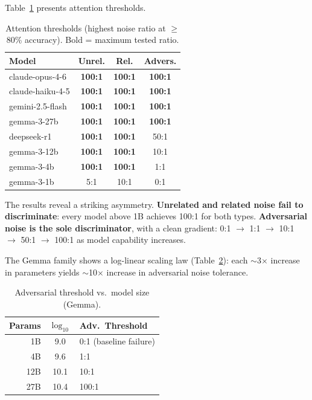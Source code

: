 \documentclass[11pt,twocolumn]{article}
\begin{document}
Table~\ref{tab:thresholds} presents attention thresholds.

\begin{table}[t]
\centering
\caption{Attention thresholds (highest noise ratio at $\geq$80\% accuracy). Bold = maximum tested ratio.}
\label{tab:thresholds}
\small
\begin{tabular}{@{}lccc@{}}
\toprule
\textbf{Model} & \textbf{Unrel.} & \textbf{Rel.} & \textbf{Advers.} \\
\midrule
claude-opus-4-6   & \textbf{100:1} & \textbf{100:1} & \textbf{100:1} \\
claude-haiku-4-5  & \textbf{100:1} & \textbf{100:1} & \textbf{100:1} \\
gemini-2.5-flash  & \textbf{100:1} & \textbf{100:1} & \textbf{100:1} \\
gemma-3-27b       & \textbf{100:1} & \textbf{100:1} & \textbf{100:1} \\
deepseek-r1       & \textbf{100:1} & \textbf{100:1} & 50:1 \\
gemma-3-12b       & \textbf{100:1} & \textbf{100:1} & 10:1 \\
gemma-3-4b        & \textbf{100:1} & \textbf{100:1} & 1:1 \\
gemma-3-1b        & 5:1            & 10:1           & 0:1 \\
\bottomrule
\end{tabular}
\end{table}

The results reveal a striking asymmetry. \textbf{Unrelated and related noise fail to discriminate}: every model above 1B achieves 100:1 for both types. \textbf{Adversarial noise is the sole discriminator}, with a clean gradient: 0:1 $\rightarrow$ 1:1 $\rightarrow$ 10:1 $\rightarrow$ 50:1 $\rightarrow$ 100:1 as model capability increases.

The Gemma family shows a log-linear scaling law (Table~\ref{tab:scaling}): each $\sim$3$\times$ increase in parameters yields $\sim$10$\times$ increase in adversarial noise tolerance.

\begin{table}[t]
\centering
\caption{Adversarial threshold vs.\ model size (Gemma).}
\label{tab:scaling}
\small
\begin{tabular}{@{}rcl@{}}
\toprule
\textbf{Params} & $\log_{10}$ & \textbf{Adv.\ Threshold} \\
\midrule
1B  & 9.0  & 0:1 (baseline failure) \\
4B  & 9.6  & 1:1 \\
12B & 10.1 & 10:1 \\
27B & 10.4 & 100:1 \\
\bottomrule
\end{tabular}
\end{table}
\end{document}
